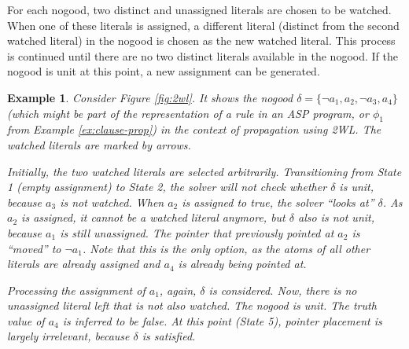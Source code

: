 \documentclass{vutinfth} %
\newtheorem{example}{Example}[chapter]
\begin{document}
For each nogood, two distinct and unassigned literals are chosen to be watched. When one of these literals is assigned, a different literal (distinct from the second watched literal) in the nogood is chosen as the new watched literal. This process is continued until there are no two distinct literals available in the nogood. If the nogood is unit at this point, a new assignment can be generated.

\begin{example}
Consider Figure \ref{fig:2wl}. It shows the nogood $\delta = \{\neg a_1, a_2, \neg a_3, a_4 \}$ (which might be part of the representation of a rule in an ASP program, or $\phi_1$ from Example \ref{ex:clause-prop}) in the context of propagation using 2WL. The watched literals are marked by arrows.

Initially, the two watched literals are selected arbitrarily. Transitioning from State 1 (empty assignment) to State 2, the solver will not check whether $\delta$ is unit, because $a_3$ is not watched. When $a_2$ is assigned to \emph{true}, the solver \enquote{looks at} $\delta$. As $a_2$ is assigned, it cannot be a watched literal anymore, but $\delta$ also is not unit, because $a_1$ is still unassigned. The pointer that previously pointed at $a_2$ is \enquote{moved} to $\neg a_1$. Note that this is the only option, as the atoms of all other literals are already assigned and $a_4$ is already being pointed at.

Processing the assignment of $a_1$, again, $\delta$ is considered. Now, there is no unassigned literal left that is not also watched. The nogood is unit. The truth value of $a_4$ is inferred to be \emph{false}. At this point (State 5), pointer placement is largely irrelevant, because $\delta$ is satisfied.
\end{example}
\end{document}
